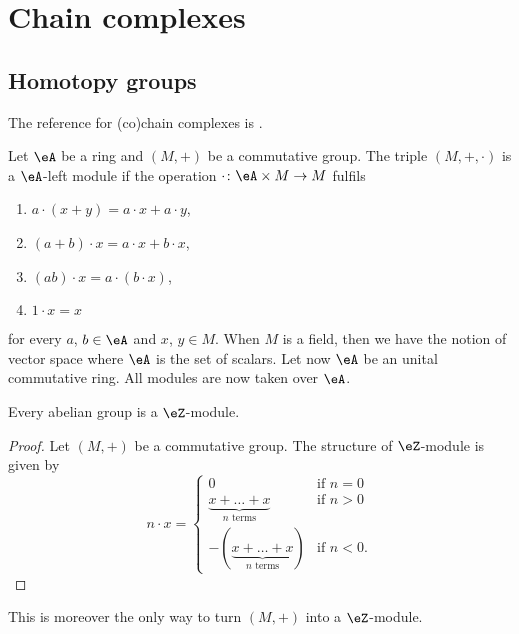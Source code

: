 					\section{Chain complexes}

					\subsection{Homotopy groups}

The reference for (co)chain complexes is \cite{TopoPaulin}. 

Let $\eA$ be a ring and $(M,+)$ be a commutative group. The triple $(M,+,\cdot)$ is a $\eA$-left module if the operation $\cdot\colon \eA\times M\to M$ fulfils
\begin{enumerate}
\item $a\cdot (x+y)=a\cdot x+a\cdot y$,
\item $(a+b)\cdot x=a\cdot x+b\cdot x$,
\item $(ab)\cdot x=a\cdot(b\cdot x)$,
\item $1\cdot x=x$
\end{enumerate}
for every $a$, $b\in \eA$ and $x$, $y\in M$. When $M$ is a field, then we have the notion of vector space where $\eA$ is the set of scalars. Let now $\eA$ be an unital commutative ring. All modules are now taken over $\eA$.

\begin{proposition}
Every abelian group is a $\eZ$-module.
\end{proposition}

\begin{proof}
Let $(M,+)$ be a commutative group. The structure of $\eZ$-module is given by
\[ 
  n\cdot x=
\begin{cases}
			0						&\text{if $n=0$}\\
			\underbrace{x+\ldots+x	}_{\text{$n$ terms}}	&\text{if $n>0$}\\
			-(\underbrace{x+\ldots+x}_{\text{$n$ terms}})	&\text{if $n<0$.}
\end{cases}
\]
\end{proof}
This is moreover the only way to turn $(M,+)$ into a $\eZ$-module.

